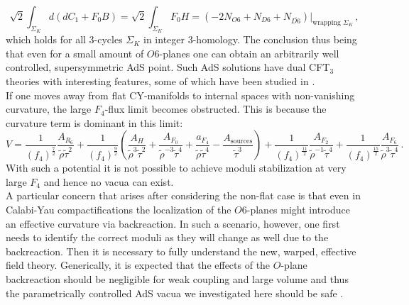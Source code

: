 \documentclass[a4paper,12pt]{report}
\newcommand{\be}{\begin{equation}}
\newcommand{\ee}{\end{equation}}
\begin{document}
\be 
\sqrt{2} \int_{\Sigma_K} d \left(dC_1 + F_0 B\right) = \sqrt{2} \int_{\Sigma_K} F_0 H = (-2 N_{O6} + N_{D6} + N_{\overline{D6}})|_{\text{wrapping }\Sigma_K}\,,
\ee
which holds for all 3-cycles $\Sigma_K$ in integer 3-homology. The conclusion thus being that even for a small amount of $O6$-planes one can obtain an arbitrarily well controlled, supersymmetric AdS point. Such AdS solutions have dual CFT$_3$ theories with interesting features, some of which have been studied in \cite{Aharony:2008wz}.\\
If one moves away from flat CY-manifolds to internal spaces with non-vanishing curvature, the large $F_4$-flux limit becomes obstructed. This is because the curvature term is dominant in this limit:
\be 
V = \frac{1}{(f_4)^ {\frac{7}{2}}} \frac{A_{R_6}}{\tilde{\rho} \tilde{\tau}^ 2} +\frac{1}{(f_4)^ {\frac{9}{2}}} \left( \frac{A_H}{\tilde{\rho}^3 \tilde{\tau}^ 2} + \frac{A_{F_0}}{\tilde{\rho}^ {-3}\tilde{\tau}^ 4} + \frac{a_{F_4}}{\tilde{\rho}\tilde{\tau}^ 4} - \frac{A_{\text{sources}}}{\tilde{\tau}^ 3} \right) + \frac{1}{(f_4)^ {\frac{11}{2}}} \frac{A_{F_2}}{\tilde{\rho}^ {-1}\tilde{\tau}^ 4} + \frac{1}{(f_4)^ {\frac{15}{2}}} \frac{A_{F_6}}{\tilde{\rho}^3\tilde{\tau}^ 4}\,.
\ee
With such a potential it is not possible to achieve moduli stabilization at very large $F_4$ and hence no vacua can exist.\\
A particular concern that arises after considering the non-flat case is that even in Calabi-Yau compactifications the localization of the $O6$-planes might introduce an effective curvature via backreaction. In such a scenario, however, one first needs to identify the correct moduli as they will change as well due to the backreaction. Then it is necessary to fully understand the new, warped, effective field theory. Generically, it is expected that the effects of the $O$-plane backreaction should be negligible for weak coupling and large volume and thus the parametrically controlled AdS vacua we investigated here should be safe \cite{Acharya:2006ne,Saracco:2012wc,Gautason:2015tig,Junghans:2020acz}. 
\end{document}
